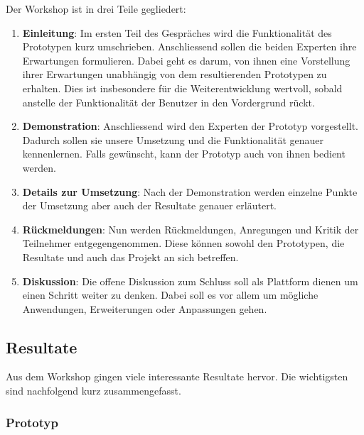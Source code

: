 Der Workshop ist in drei Teile gegliedert:
\begin{enumerate}
    \item \textbf{Einleitung}: Im ersten Teil des Gespräches wird die Funktionalität des Prototypen kurz umschrieben. Anschliessend sollen die beiden Experten ihre Erwartungen formulieren. Dabei geht es darum, von ihnen eine Vorstellung ihrer Erwartungen unabhängig von dem resultierenden Prototypen zu erhalten. Dies ist insbesondere für die Weiterentwicklung wertvoll, sobald anstelle der Funktionalität der Benutzer in den Vordergrund rückt.
    \item \textbf{Demonstration}: Anschliessend wird den Experten der Prototyp vorgestellt. Dadurch sollen sie unsere Umsetzung und die Funktionalität genauer kennenlernen. Falls gewünscht, kann der Prototyp auch von ihnen bedient werden.
    \item \textbf{Details zur Umsetzung}: Nach der Demonstration werden einzelne Punkte der Umsetzung aber auch der Resultate genauer erläutert.
    \item \textbf{Rückmeldungen}: Nun werden Rückmeldungen, Anregungen und Kritik der Teilnehmer entgegengenommen. Diese können sowohl den Prototypen, die Resultate und auch das Projekt an sich betreffen.
    \item \textbf{Diskussion}: Die offene Diskussion zum Schluss soll als Plattform dienen um einen Schritt weiter zu denken. Dabei soll es vor allem um mögliche Anwendungen, Erweiterungen oder Anpassungen gehen.
\end{enumerate}

\subsection{Resultate}

Aus dem Workshop gingen viele interessante Resultate hervor. Die wichtigsten sind nachfolgend kurz zusammengefasst.

\subsubsection{Prototyp}

